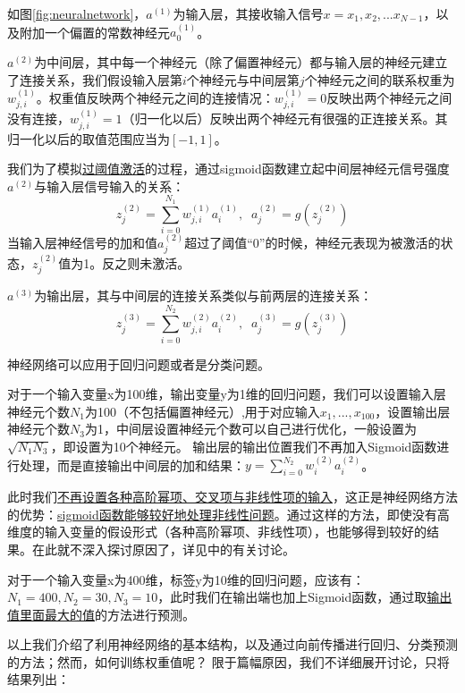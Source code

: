 如图\ref{fig:neuralnetwork}，$a^{(1)}$为输入层，其接收输入信号$x = {x_1, x_2, ... x_{N-1}}$，以及附加一个偏置的常数神经元$a^{(1)}_0$。

$a^{(2)}$为中间层，其中每一个神经元（除了偏置神经元）都与输入层的神经元建立了连接关系，我们假设输入层第$i$个神经元与中间层第$j$个神经元之间的联系权重为$w^{(1)}_{j,i}$。权重值反映两个神经元之间的连接情况：$w^{(1)}_{j,i}=0$反映出两个神经元之间没有连接，$w^{(1)}_{j,i}=1$（归一化以后）反映出两个神经元有很强的正连接关系。其归一化以后的取值范围应当为$[-1,1]$。

我们为了模拟\uline{过阈值激活}的过程，通过sigmoid函数建立起中间层神经元信号强度$a^{(2)}$与输入层信号输入的关系：
\begin{equation}
z^{(2)}_j = \sum^{N_1}_{i = 0} w^{(1)}_{j,i} a^{(1)}_i,\;\; a^{(2)}_j = g(z^{(2)}_j )
\end{equation}
当输入层神经信号的加和值$a^{(2)}_j$超过了阈值“0”的时候，神经元表现为被激活的状态，$z^{(2)}_j$值为1。反之则未激活。

$a^{(3)}$为输出层，其与中间层的连接关系类似与前两层的连接关系：
\begin{equation}
z^{(3)}_j = \sum^{N_2}_{i = 0} w^{(2)}_{j,i} a^{(2)}_i,\;\; a^{(3)}_j = g(z^{(3)}_j )
\end{equation}

神经网络可以应用于回归问题或者是分类问题。

对于一个输入变量x为100维，输出变量y为1维的回归问题，我们可以设置输入层神经元个数$N_1$为100（不包括偏置神经元）,用于对应输入$x_1,...,x_100$，设置输出层神经元个数$N_3$为1，中间层设置神经元个数可以自己进行优化，一般设置为$\sqrt{N_1 N_3}$，即设置为10个神经元。 输出层的输出位置我们不再加入Sigmoid函数进行处理，而是直接输出中间层的加和结果：$y = \sum^{N_2}_{i=0} w^{(2)}_{i} a^{(2)}_i$。

此时我们\uline{不再设置各种高阶幂项、交叉项与非线性项的输入}，这正是神经网络方法的优势：\uline{sigmoid函数能够较好地处理非线性问题}。通过这样的方法，即使没有高维度的输入变量的假设形式（各种高阶幂项、非线性项），也能够得到较好的结果。在此就不深入探讨原因了，详见\cite{standford_machine_learning_cs229}中的有关讨论。

对于一个输入变量x为400维，标签y为10维的回归问题，应该有：$N_1 = 400, N_2 = 30, N_3 = 10$，此时我们在输出端也加上Sigmoid函数，通过取\uline{输出值里面最大的值}的方法进行预测。

以上我们介绍了利用神经网络的基本结构，以及通过向前传播进行回归、分类预测的方法；然而，如何训练权重值呢？ 限于篇幅原因，我们不详细展开讨论，只将结果列出：

